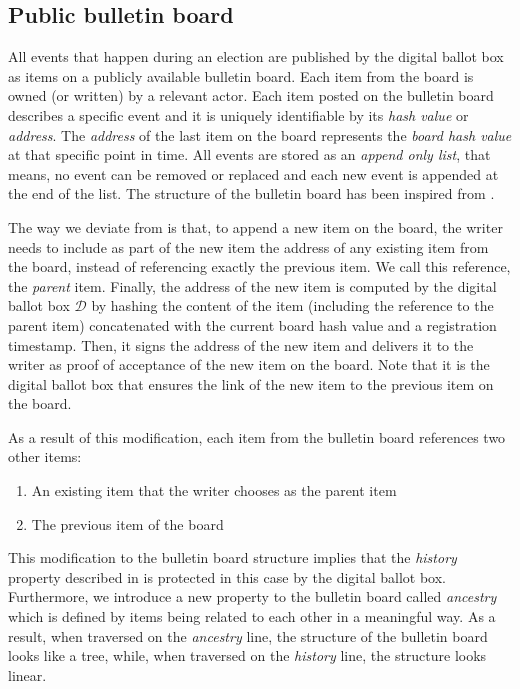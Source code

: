 \subsection{Public bulletin board} \label{sec: public bulletin board}
All events that happen during an election are published by the digital ballot box as items on a publicly available bulletin board. Each item from the board is owned (or written) by a relevant actor. Each item posted on the bulletin board describes a specific event and it is uniquely identifiable by its \textit{hash value} or \textit{address}. The \textit{address} of the last item on the board represents the \textit{board hash value} at that specific point in time. All events are stored as an \textit{append only list}, that means, no event can be removed or replaced and each new event is appended at the end of the list. The structure of the bulletin board has been inspired from \cite{Heather09}.

The way we deviate from \cite{Heather09} is that, to append a new item on the board, the writer needs to include as part of the new item the address of any existing item from the board, instead of referencing exactly the previous item. We call this reference, the \textit{parent} item. Finally, the address of the new item is computed by the digital ballot box $\mathcal{D}$ by hashing the content of the item (including the reference to the parent item) concatenated with the current board hash value and a registration timestamp. Then, it signs the address of the new item and delivers it to the writer as proof of acceptance of the new item on the board. Note that it is the digital ballot box that ensures the link of the new item to the previous item on the board.

As a result of this modification, each item from the bulletin board references two other items:
\begin{enumerate}
    \item An existing item that the writer chooses as the parent item
    \item The previous item of the board
\end{enumerate}

This modification to the bulletin board structure implies that the \textit{history} property described in \cite{Heather09} is protected in this case by the digital ballot box. Furthermore, we introduce a new property to the bulletin board called \textit{ancestry} which is defined by items being related to each other in a meaningful way. As a result, when traversed on the \textit{ancestry} line, the structure of the bulletin board looks like a tree, while, when traversed on the \textit{history} line, the structure looks linear. 

